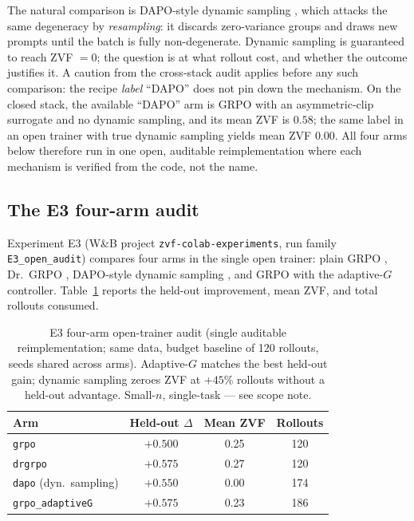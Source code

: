 \documentclass{article}
\begin{document}
The natural comparison is DAPO-style dynamic sampling \citep{yu2025dapo},
which attacks the same degeneracy by \emph{resampling}: it discards
zero-variance groups and draws new prompts until the batch is fully
non-degenerate. Dynamic sampling is guaranteed to reach ZVF $= 0$; the
question is at what rollout cost, and whether the outcome justifies it.
A caution from the cross-stack audit applies before any such comparison:
the recipe \emph{label} ``DAPO'' does not pin down the mechanism. On the
closed stack, the available ``DAPO'' arm is GRPO with an asymmetric-clip
surrogate and no dynamic sampling, and its mean ZVF is $0.58$; the same
label in an open trainer with true dynamic sampling yields mean ZVF
$0.00$. All four arms below therefore run in one open, auditable
reimplementation where each mechanism is verified from the code, not the
name.

\subsection{The E3 four-arm audit}
\label{sec:p7-e3}
Experiment E3 (W\&B project \texttt{zvf-colab-experiments}, run family
\texttt{E3\_open\_audit}) compares four arms in the single open trainer:
plain GRPO \citep{shao2024deepseekmath}, Dr.~GRPO \citep{tong2025drgrpo},
DAPO-style dynamic sampling \citep{yu2025dapo}, and GRPO with the
adaptive-$G$ controller. Table~\ref{tab:p7-e3} reports the held-out
improvement, mean ZVF, and total rollouts consumed.

\begin{table}[t]
\centering
\caption{E3 four-arm open-trainer audit (single auditable reimplementation;
same data, budget baseline of 120 rollouts, seeds shared across arms).
Adaptive-$G$ matches the best held-out gain; dynamic sampling zeroes ZVF at
$+45\%$ rollouts without a held-out advantage. Small-$n$, single-task ---
see scope note.}
\label{tab:p7-e3}
\begin{tabular}{lccc}
\toprule
Arm & Held-out $\Delta$ & Mean ZVF & Rollouts \\
\midrule
\texttt{grpo}            & $+0.500$ & 0.25 & 120 \\
\texttt{drgrpo}          & $+0.575$ & 0.27 & 120 \\
\texttt{dapo} (dyn.\ sampling) & $+0.550$ & 0.00 & 174 \\
\texttt{grpo\_adaptiveG} & $+0.575$ & 0.23 & 186 \\
\bottomrule
\end{tabular}
\end{table}
\end{document}
